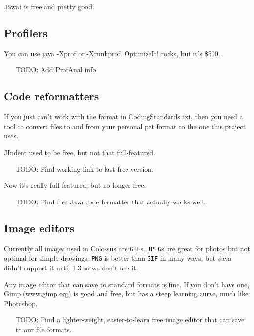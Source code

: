 \documentclass{article}
\begin{document}
\texttt{JS}wat is free and pretty good.

\subsection{Profilers}

You can use java -Xprof or -Xrunhprof.
OptimizeIt! rocks, but it's \$500.
\begin{itemize}
\item[TODO:] Add ProfAnal info.
\end{itemize}

\subsection{Code reformatters}

If you just can't work with the format in CodingStandards.txt, then you
need a tool to convert files to and from your personal pet format to the
one this project uses.

JIndent used to be free, but not that full-featured. 
\begin{itemize}
\item[TODO:] Find working link to last free version.
\end{itemize}
Now it's really full-featured, but no longer free.
\begin{itemize}
\item[TODO:] Find free Java code formatter that actually works well.
\end{itemize}

\subsection{Image editors}

Currently all images used in Colossus are \texttt{GIF}s. \texttt{JPEG}s are great for
photos but not optimal for simple drawings. \texttt{PNG} is better than \texttt{GIF} 
in many ways, but Java didn't support it until 1.3 so we don't use it.

Any image editor that can save to standard formats is fine. If you
don't have one, Gimp (www.gimp.org) is good and free, but has a steep
learning curve, much like Photoshop. 
\begin{itemize}
\item[TODO:] Find a lighter-weight, easier-to-learn free image editor that 
can save to our file formats.
\end{itemize}
\end{document}
